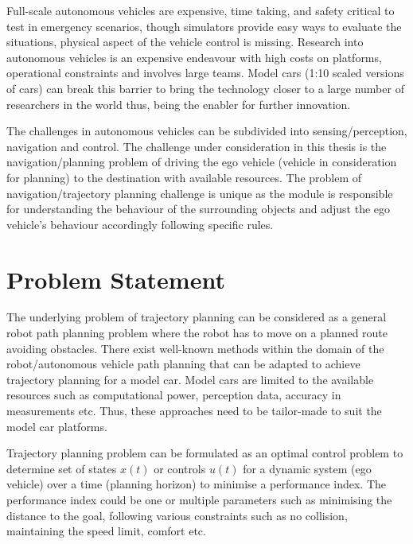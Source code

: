 Full-scale autonomous vehicles are expensive, time taking, and safety critical to test in emergency scenarios, though simulators provide easy ways to evaluate the situations, physical aspect of the vehicle control is missing. Research into autonomous vehicles is an expensive endeavour with high costs on platforms, operational constraints and involves large teams. Model cars (1:10 scaled versions of cars) can break this barrier to bring the technology closer to a large number of researchers in the world thus, being the enabler for further innovation.

The challenges in autonomous vehicles can be subdivided into sensing/perception, navigation and control. The challenge under consideration in this thesis is the navigation/planning problem of driving the ego vehicle (vehicle in consideration for planning) to the destination with available resources. The problem of navigation/trajectory planning challenge is unique as the module is responsible for understanding the behaviour of the surrounding objects and adjust the ego vehicle's behaviour accordingly following specific rules.

\section{Problem Statement}

The underlying problem of trajectory planning can be considered as a general robot path planning problem where the robot has to move on a planned route avoiding obstacles. There exist well-known methods within the domain of the robot/autonomous vehicle path planning that can be adapted to achieve trajectory planning for a model car. Model cars are limited to the available resources such as computational power, perception data, accuracy in measurements etc. Thus, these approaches need to be tailor-made to suit the model car platforms.

Trajectory planning problem can be formulated as an optimal control problem to determine set of states $x(t)$ or controls $u(t)$ for a dynamic system (ego vehicle) over a time (planning horizon) to minimise a performance index. The performance index could be one or multiple parameters such as minimising the distance to the goal, following various constraints such as no collision, maintaining the speed limit, comfort etc.



